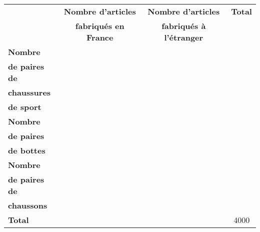 \begin{tabular}{|@{\ }l@{\ }|@{\ }c@{\ }|@{\ }c@{\ }|c|}
	\hline
	& \textbf{Nombre d'articles}     & \textbf{Nombre d'articles}       &    \textbf{Total}      \\
	& \textbf{fabriqués en France}  & \textbf{fabriqués à l'étranger}    &                \\ \hline
	\textbf{Nombre}       &                     &                       &                \\
	\textbf{de paires de} &                     &                       &                \\
	\textbf{chaussures}   &                     &                       &                \\
	\textbf{de sport}     &                     &                       &                \\ \hline
	\textbf{Nombre}       &                     &                       &                \\
	\textbf{de paires}    &                     &                       &                \\
	\textbf{de bottes}    &                     &                       &                \\ \hline 
	\textbf{Nombre}       &                     &                       &                \\
	\textbf{de paires de} &                     &                       &                \\
	\textbf{chaussons}    &                     &                       &                \\ \hline
	\textbf{Total}        &                     &                       & 4000          \\ \hline
\end{tabular}